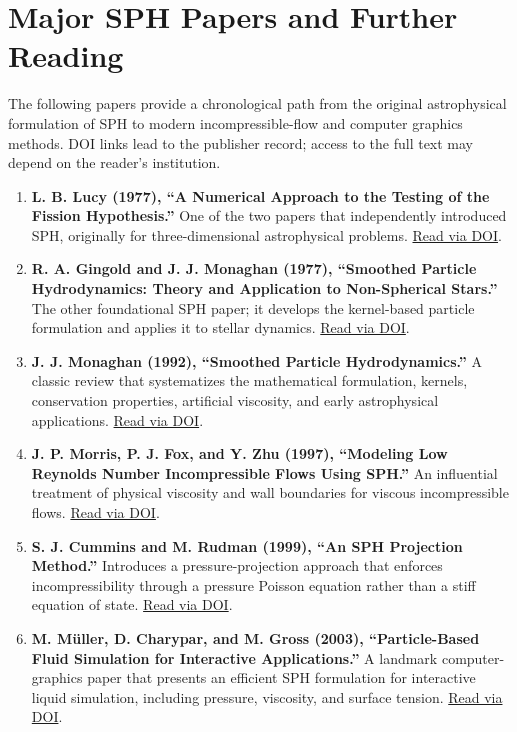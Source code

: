 \documentclass[11pt]{article}
\begin{document}
\section{Major SPH Papers and Further Reading}

The following papers provide a chronological path from the original
astrophysical formulation of SPH to modern incompressible-flow and computer
graphics methods. DOI links lead to the publisher record; access to the full
text may depend on the reader's institution.

\begin{enumerate}
    \item \textbf{L. B. Lucy (1977), ``A Numerical Approach to the Testing of
    the Fission Hypothesis.''} One of the two papers that independently
    introduced SPH, originally for three-dimensional astrophysical problems.
    \href{https://doi.org/10.1086/112164}{Read via DOI}.

    \item \textbf{R. A. Gingold and J. J. Monaghan (1977), ``Smoothed Particle
    Hydrodynamics: Theory and Application to Non-Spherical Stars.''} The other
    foundational SPH paper; it develops the kernel-based particle formulation
    and applies it to stellar dynamics.
    \href{https://doi.org/10.1093/mnras/181.3.375}{Read via DOI}.

    \item \textbf{J. J. Monaghan (1992), ``Smoothed Particle Hydrodynamics.''}
    A classic review that systematizes the mathematical formulation, kernels,
    conservation properties, artificial viscosity, and early astrophysical
    applications.
    \href{https://doi.org/10.1146/annurev.aa.30.090192.002551}{Read via DOI}.

    \item \textbf{J. P. Morris, P. J. Fox, and Y. Zhu (1997), ``Modeling Low
    Reynolds Number Incompressible Flows Using SPH.''} An influential treatment
    of physical viscosity and wall boundaries for viscous incompressible flows.
    \href{https://doi.org/10.1006/jcph.1997.5776}{Read via DOI}.

    \item \textbf{S. J. Cummins and M. Rudman (1999), ``An SPH Projection
    Method.''} Introduces a pressure-projection approach that enforces
    incompressibility through a pressure Poisson equation rather than a stiff
    equation of state.
    \href{https://doi.org/10.1006/jcph.1999.6246}{Read via DOI}.

    \item \textbf{M. M{\"u}ller, D. Charypar, and M. Gross (2003),
    ``Particle-Based Fluid Simulation for Interactive Applications.''} A
    landmark computer-graphics paper that presents an efficient SPH
    formulation for interactive liquid simulation, including pressure,
    viscosity, and surface tension.
    \href{https://doi.org/10.2312/SCA03/154-159}{Read via DOI}.


\end{enumerate}
\end{document}
